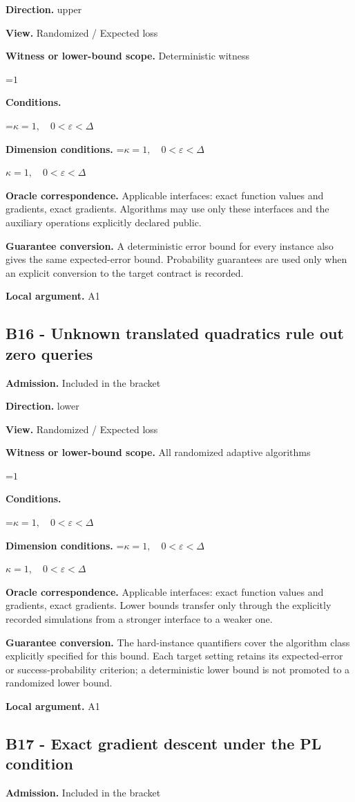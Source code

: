 \documentclass[10pt,a4paper]{article}
\newcommand{\AtlasMath}[1]{\par\begingroup\centering\setbox0=\hbox{$\displaystyle #1$}\ifdim\wd0>1.4\linewidth\typeout{ATLAS WIDE FORMULA: \the\wd0}\fi\ifdim\wd0>\linewidth\resizebox{\linewidth}{!}{\box0}\else\box0\fi\par\endgroup}
\newcommand{\AtlasInlineMath}[1]{\begingroup\setbox0=\hbox{$#1$}\ifdim\wd0>.4\linewidth\endgroup\AtlasMath{#1}\else\endgroup$#1$\fi}
\begin{document}
\textbf{Direction.} upper

\textbf{View.} Randomized / Expected loss

\textbf{Witness or lower-bound scope.} Deterministic witness

\AtlasMath{1}
\textbf{Conditions.} 
\AtlasMath{\kappa=1,\quad0<\varepsilon<\Delta}


\textbf{Dimension conditions.} \AtlasInlineMath{\kappa=1,\quad0<\varepsilon<\Delta}

\textbf{Oracle correspondence.} Applicable interfaces: exact function values and gradients, exact gradients. Algorithms may use only these interfaces and the auxiliary operations explicitly declared public.

\textbf{Guarantee conversion.} A deterministic error bound for every instance also gives the same expected-error bound. Probability guarantees are used only when an explicit conversion to the target contract is recorded.

\textbf{Local argument.} A1

\subsection{B16 - Unknown translated quadratics rule out zero queries}
\textbf{Admission.} Included in the bracket

\textbf{Direction.} lower

\textbf{View.} Randomized / Expected loss

\textbf{Witness or lower-bound scope.} All randomized adaptive algorithms

\AtlasMath{1}
\textbf{Conditions.} 
\AtlasMath{\kappa=1,\quad0<\varepsilon<\Delta}


\textbf{Dimension conditions.} \AtlasInlineMath{\kappa=1,\quad0<\varepsilon<\Delta}

\textbf{Oracle correspondence.} Applicable interfaces: exact function values and gradients, exact gradients. Lower bounds transfer only through the explicitly recorded simulations from a stronger interface to a weaker one.

\textbf{Guarantee conversion.} The hard-instance quantifiers cover the algorithm class explicitly specified for this bound. Each target setting retains its expected-error or success-probability criterion; a deterministic lower bound is not promoted to a randomized lower bound.

\textbf{Local argument.} A1

\subsection{B17 - Exact gradient descent under the PL condition}
\textbf{Admission.} Included in the bracket
\end{document}
